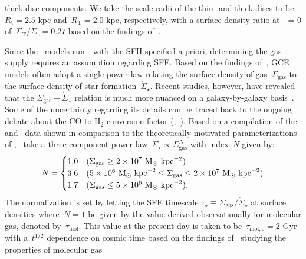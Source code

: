 \documentclass[ms.tex]{subfiles}
\begin{document}
thick-disc components.
We take the scale radii of the thin- and thick-discs to be~$R_\text{t} = 2.5$
kpc and~$R_\text{T} = 2.0$ kpc, respectively, with a surface density ratio
at~\rgal~= 0 of~$\Sigma_\text{T} / \Sigma_\text{t} = 0.27$ based on the
findings of~\citet{Bland-Hawthorn2016}.
\par
Since the~\citet{Johnson2021} models run~\vice~with the SFH specified a priori,
determining the gas supply requires an assumption regarding SFE.
Based on the findings of~\citet{Kennicutt1998}, GCE models often adopt a
single power-law relating the surface density of gas~$\Sigma_\text{gas}$ to
the surface density of star formation~$\dot{\Sigma}_\star$.
Recent studies, however, have revealed that the
$\Sigma_\text{gas} - \dot{\Sigma}_\star$ relation is much more nuanced on a
galaxy-by-galaxy basis~\citep{delosReyes2019, Ellison2021, Kennicutt2021}.
Some of the uncertainty regarding its details can be traced back to the
ongoing debate about the CO-to-H$_2$ conversion factor
(\citealp{Kennicutt2012};~\citealp*{Liu2015}).
Based on a compilation of the~\citet{Bigiel2010} and~\citet{Leroy2013} data
shown in comparison to the theoretically motivated parameterizations of
\citet[][see their Fig. 2]{Krumholz2018},~\citet{Johnson2021} take a
three-component power-law~$\dot{\Sigma}_\star \propto \Sigma_\text{gas}^N$ with
index~$N$ given by:
\begin{equation}
N =
\begin{cases}
1.0 & (\Sigma_\text{gas} \geq 2\times10^7~\text{M}_\odot~\text{kpc}^{-2}) \\
3.6 & (5\times10^6~\text{M}_\odot~\text{kpc}^{-2} \leq \Sigma_\text{gas} \leq
2\times10^7~\text{M}_\odot~\text{kpc}^{-2}) \\
1.7 & (\Sigma_\text{gas} \leq 5\times10^6~\text{M}_\odot~\text{kpc}^{-2}).
\end{cases}
\label{eq:sflaw_indeces}
\end{equation}
The normalization is set by letting the SFE timescale
$\tau_\star \equiv \Sigma_\text{gas} / \dot{\Sigma}_\star$ at surface densities
where~$N = 1$ be given by the value derived observationally for molecular gas,
denoted by~$\tau_\text{mol}$.
This value at the present day is taken to be~$\tau_{\text{mol},0} = 2$ Gyr
\citep{Leroy2008, Leroy2013} with a~$t^{1/2}$ dependence on cosmic time based
on the findings of~\citet{Tacconi2018} studying the properties of molecular gas
\end{document}
